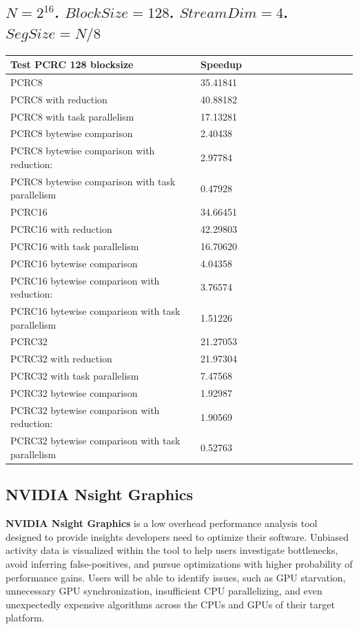 \documentclass[fleqn]{IEEEtran}
\begin{document}
\subsection{$N=2^{16}$. $BlockSize=128$. $StreamDim=4$. $SegSize=N/8$}
\begin{footnotesize}
\begin{tabular}{l|l|l|l|l|r|r|r|r|r|r||c|c|}
\toprule
\textbf{Test PCRC 128 blocksize} & \textbf{Speedup} \\
\midrule
PCRC8                                           &	35.41841 \\
PCRC8 with reduction                            &	40.88182 \\
PCRC8 with task parallelism                     &	17.13281 \\
PCRC8 bytewise comparison                       &	2.40438  \\
PCRC8 bytewise comparison with reduction:       &	2.97784  \\
PCRC8 bytewise comparison with task parallelism &	0.47928  \\
PCRC16                                           &	34.66451 \\
PCRC16 with reduction                            &	42.29803 \\
PCRC16 with task parallelism                     &	16.70620 \\
PCRC16 bytewise comparison                       &	4.04358  \\
PCRC16 bytewise comparison with reduction:       &	3.76574  \\
PCRC16 bytewise comparison with task parallelism &	1.51226  \\
PCRC32                                           &	21.27053 \\
PCRC32 with reduction                            &	21.97304 \\
PCRC32 with task parallelism                     &	7.47568  \\
PCRC32 bytewise comparison                       &	1.92987  \\
PCRC32 bytewise comparison with reduction:       &	1.90569  \\
PCRC32 bytewise comparison with task parallelism &	0.52763  \\
\bottomrule
\end{tabular}
\end{footnotesize}

\subsection{NVIDIA Nsight Graphics}
\textbf{NVIDIA Nsight Graphics} is a low overhead performance analysis tool 
designed to provide insights developers need to optimize their software. 
Unbiased activity data is visualized within the tool to help users investigate 
bottlenecks, avoid inferring false-positives, and pursue optimizations with 
higher probability of performance gains. Users will be able to identify issues, 
such as GPU starvation, unnecessary GPU synchronization, insufficient CPU 
parallelizing, and even unexpectedly expensive algorithms across the CPUs and 
GPUs of their target platform.
\end{document}
